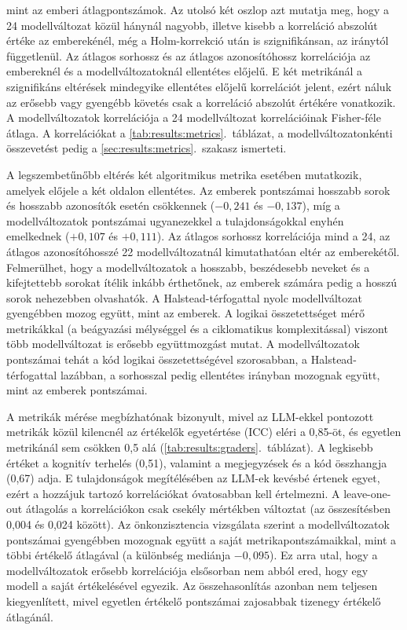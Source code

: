 \documentclass[
]{elteikthesis}[2024/04/26]
\begin{document}
\begin{table}[htbp]
{	mint az emberi átlagpontszámok. Az utolsó két oszlop azt mutatja meg, hogy a 24 modellváltozat közül
	hánynál nagyobb, illetve kisebb a korreláció abszolút értéke az emberekénél, még a Holm-korrekció után is
	szignifikánsan, az iránytól függetlenül. Az átlagos sorhossz és az átlagos azonosítóhossz korrelációja az
	embereknél és a modellváltozatoknál ellentétes előjelű. E két metrikánál a szignifikáns eltérések mindegyike
	ellentétes előjelű korrelációt jelent, ezért náluk az erősebb vagy gyengébb követés csak a korreláció abszolút
	értékére vonatkozik. A modellváltozatok korrelációja a 24 modellváltozat
	korrelációinak Fisher-féle átlaga. A korrelációkat a \ref{tab:results:metrics}.~táblázat, a
	modellváltozatonkénti összevetést pedig a \ref{sec:results:metrics}.~szakasz ismerteti.}
	\label{tab:discussion:metrics}
\end{table}

A legszembetűnőbb eltérés két algoritmikus metrika esetében mutatkozik, amelyek előjele a két oldalon ellentétes.
Az emberek pontszámai hosszabb sorok és hosszabb azonosítók esetén csökkennek ($-0{,}241$ és $-0{,}137$),
míg a modellváltozatok pontszámai ugyanezekkel a tulajdonságokkal enyhén emelkednek ($+0{,}107$ és $+0{,}111$).
Az átlagos sorhossz korrelációja mind a 24, az átlagos azonosítóhosszé 22 modellváltozatnál kimutathatóan eltér az emberekétől.
Felmerülhet, hogy a modellváltozatok a hosszabb, beszédesebb neveket
és a kifejtettebb sorokat ítélik inkább érthetőnek,
az emberek számára pedig a hosszú sorok nehezebben olvashatók.
A Halstead-térfogattal nyolc modellváltozat gyengébben mozog együtt, mint az emberek.
A logikai összetettséget mérő metrikákkal (a beágyazási mélységgel és a ciklomatikus komplexitással)
viszont több modellváltozat is erősebb együttmozgást mutat.
A modellváltozatok pontszámai tehát a kód logikai összetettségével szorosabban,
a Halstead-térfogattal lazábban, a sorhosszal pedig ellentétes irányban mozognak együtt,
mint az emberek pontszámai.

A metrikák mérése megbízhatónak bizonyult,
mivel az LLM-ekkel pontozott metrikák közül kilencnél az értékelők egyetértése (ICC) eléri a 0,85-öt,
és egyetlen metrikánál sem csökken 0,5 alá (\ref{tab:results:graders}.~táblázat).
A legkisebb értéket a kognitív terhelés (0,51), valamint a megjegyzések és a kód összhangja (0,67) adja.
E tulajdonságok megítélésében az LLM-ek kevésbé értenek egyet,
ezért a hozzájuk tartozó korrelációkat óvatosabban kell értelmezni.
A leave-one-out átlagolás a korrelációkon csak csekély mértékben változtat (az összesítésben 0,004 és 0,024 között).
Az önkonzisztencia vizsgálata szerint a modellváltozatok pontszámai gyengébben mozognak együtt
a saját metrikapontszámaikkal, mint a többi értékelő átlagával (a különbség mediánja $-0{,}095$).
Ez arra utal, hogy a modellváltozatok erősebb korrelációja elsősorban nem abból ered, hogy egy modell a saját értékelésével egyezik.
Az összehasonlítás azonban nem teljesen kiegyenlített, mivel egyetlen értékelő pontszámai zajosabbak tizenegy értékelő átlagánál.
\end{document}
